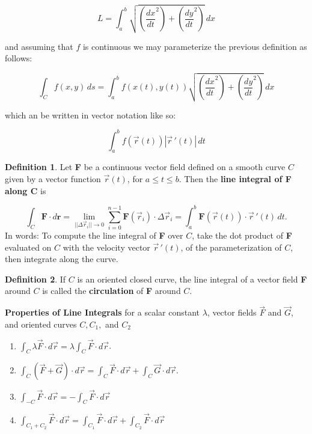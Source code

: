 \documentclass[12pt, a4paper]{article}
\theoremstyle{plain}
\theoremstyle{definition}
\newtheorem{definition}{Definition}[section]
\theoremstyle{remark}
\begin{document}
$$ L =  \int_a^b \sqrt{ \left( \frac{dx}{dt}^2  \right) + \left( \frac{dy}{dt}^2  \right)} \, dx  $$

and assuming that $f$ is continuous we may parameterize the previous definition as follows:

$$ \int_C f(x, y) \,ds = \int_a^b f(x(t), y(t)) \sqrt{ \left( \frac{dx}{dt}^2  \right) + \left( \frac{dy}{dt}^2  \right)} \, dx$$

which an be written in vector notation like so:

$$ \int_a^b f(\vec{r}(t)) |\vec{r} \, '(t)| \, dt $$


\begin{definition} Let \textbf{F} be a continuous vector field defined on a smooth curve $C$ given by a vector function $\vec{r}(t)$, for $a \le t \le b$. Then the \textbf{line integral of F along C} is 

$$ \int_C \textbf{F} \cdot d \textbf{r} = \lim_{||\Delta \vec{r}_i ||\to 0} \sum_{i=0}^{n-1} \textbf{F}(\vec{r}_i) \cdot \Delta \vec{r}_i   =  \int_a^b \textbf{F} (\vec{r}(t)) \cdot \vec{r} \, '(t) \, dt. $$
In words: To compute the line integral of \textbf{F} over $C$, take the dot product of \textbf{F} evaluated on $C$ with the velocity vector $\vec{r} \, '(t)$, of the parameterization of $C$, then integrate along the curve.
\end{definition}

\begin{definition}
If $C$ is an oriented closed curve, the line integral of a vector field \textbf{F} around $C$ is called the \textbf{circulation} of \textbf{F} around $C$.
\end{definition}

\textbf{Properties of Line Integrals} for a scalar constant $\lambda$, vector fields $\vec{F}$ and $\vec{G}$, and oriented curves $C, C_1,$ and  $C_2$
\begin{enumerate}
\item $\int_C \lambda \vec{F} \cdot d \vec{r} = \lambda \int_C  \vec{F} \cdot d \vec{r}$.
\item $\int_C (\vec{F} + \vec{G}) \cdot d \vec{r} = \int_C \vec{F} \cdot d \vec{r} + \int_C \vec{G} \cdot d \vec{r}. $
\item $\int_{-C} \vec{F} \cdot d \vec{r} = - \int_C \vec{F} \cdot d \vec{r}$
\item $\int_{C_1 +C_2} \vec{F} \cdot d \vec{r} = \int_{C_1} \vec{F} \cdot d \vec{r} + \int_{C_2} \vec{F} \cdot d \vec{r}$
\end{enumerate}
\end{document}
